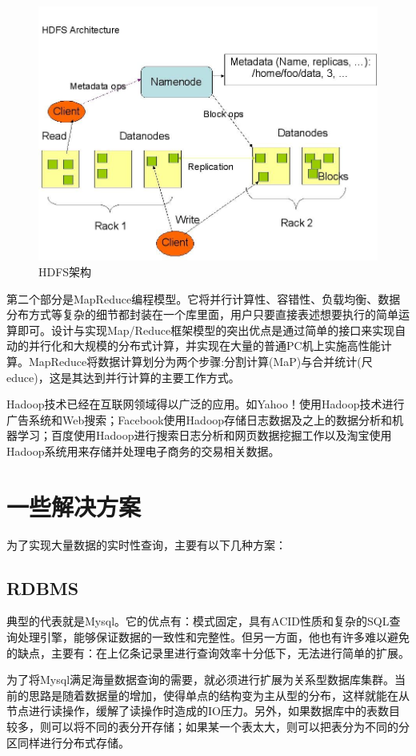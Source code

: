 \begin{figure}[!ht]
\centering
\includegraphics[scale=0.5]{photo/HDFS.jpg}
\caption{HDFS架构}
\end{figure} 


  第二个部分是MapReduce编程模型。它将并行计算性、容错性、负载均衡、数据分布方式等复杂的细节都封装在一个库里面，用户只要直接表述想要执行的简单运算即可。设计与实现Map/Reduce框架模型的突出优点是通过简单的接口来实现自动的并行化和大规模的分布式计算，并实现在大量的普通PC机上实施高性能计算。MapReduce将数据计算划分为两个步骤:分割计算(MaP)与合并统计(尺educe)，这是其达到并行计算的主要工作方式。

  Hadoop技术已经在互联网领域得以广泛的应用。如Yahoo！使用Hadoop技术进行广告系统和Web搜索；Facebook使用Hadoop存储日志数据及之上的数据分析和机器学习；百度使用Hadoop进行搜索日志分析和网页数据挖掘工作以及淘宝使用Hadoop系统用来存储并处理电子商务的交易相关数据。


\section{一些解决方案}
  为了实现大量数据的实时性查询，主要有以下几种方案：
\subsection{RDBMS}
  典型的代表就是Mysql。它的优点有：模式固定，具有ACID性质和复杂的SQL查询处理引擎，能够保证数据的一致性和完整性。但另一方面，他也有许多难以避免的缺点，主要有：在上亿条记录里进行查询效率十分低下，无法进行简单的扩展。


  为了将Mysql满足海量数据查询的需要，就必须进行扩展为关系型数据库集群。当前的思路是随着数据量的增加，使得单点的结构变为主从型的分布，这样就能在从节点进行读操作，缓解了读操作时造成的IO压力。另外，如果数据库中的表数目较多，则可以将不同的表分开存储；如果某一个表太大，则可以把表分为不同的分区同样进行分布式存储。



